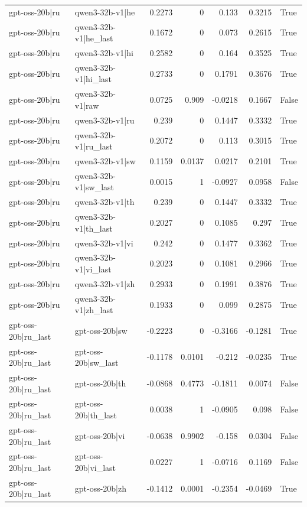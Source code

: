 \begin{table}
\begin{tabular}{l l r r r r l}
gpt-oss-20b|ru & qwen3-32b-v1|he & 0.2273 & 0 & 0.133 & 0.3215 & True \\
gpt-oss-20b|ru & qwen3-32b-v1|he_last & 0.1672 & 0 & 0.073 & 0.2615 & True \\
gpt-oss-20b|ru & qwen3-32b-v1|hi & 0.2582 & 0 & 0.164 & 0.3525 & True \\
gpt-oss-20b|ru & qwen3-32b-v1|hi_last & 0.2733 & 0 & 0.1791 & 0.3676 & True \\
gpt-oss-20b|ru & qwen3-32b-v1|raw & 0.0725 & 0.909 & -0.0218 & 0.1667 & False \\
gpt-oss-20b|ru & qwen3-32b-v1|ru & 0.239 & 0 & 0.1447 & 0.3332 & True \\
gpt-oss-20b|ru & qwen3-32b-v1|ru_last & 0.2072 & 0 & 0.113 & 0.3015 & True \\
gpt-oss-20b|ru & qwen3-32b-v1|sw & 0.1159 & 0.0137 & 0.0217 & 0.2101 & True \\
gpt-oss-20b|ru & qwen3-32b-v1|sw_last & 0.0015 & 1 & -0.0927 & 0.0958 & False \\
gpt-oss-20b|ru & qwen3-32b-v1|th & 0.239 & 0 & 0.1447 & 0.3332 & True \\
gpt-oss-20b|ru & qwen3-32b-v1|th_last & 0.2027 & 0 & 0.1085 & 0.297 & True \\
gpt-oss-20b|ru & qwen3-32b-v1|vi & 0.242 & 0 & 0.1477 & 0.3362 & True \\
gpt-oss-20b|ru & qwen3-32b-v1|vi_last & 0.2023 & 0 & 0.1081 & 0.2966 & True \\
gpt-oss-20b|ru & qwen3-32b-v1|zh & 0.2933 & 0 & 0.1991 & 0.3876 & True \\
gpt-oss-20b|ru & qwen3-32b-v1|zh_last & 0.1933 & 0 & 0.099 & 0.2875 & True \\
gpt-oss-20b|ru_last & gpt-oss-20b|sw & -0.2223 & 0 & -0.3166 & -0.1281 & True \\
gpt-oss-20b|ru_last & gpt-oss-20b|sw_last & -0.1178 & 0.0101 & -0.212 & -0.0235 & True \\
gpt-oss-20b|ru_last & gpt-oss-20b|th & -0.0868 & 0.4773 & -0.1811 & 0.0074 & False \\
gpt-oss-20b|ru_last & gpt-oss-20b|th_last & 0.0038 & 1 & -0.0905 & 0.098 & False \\
gpt-oss-20b|ru_last & gpt-oss-20b|vi & -0.0638 & 0.9902 & -0.158 & 0.0304 & False \\
gpt-oss-20b|ru_last & gpt-oss-20b|vi_last & 0.0227 & 1 & -0.0716 & 0.1169 & False \\
gpt-oss-20b|ru_last & gpt-oss-20b|zh & -0.1412 & 0.0001 & -0.2354 & -0.0469 & True \\

\end{tabular}
\end{table}
